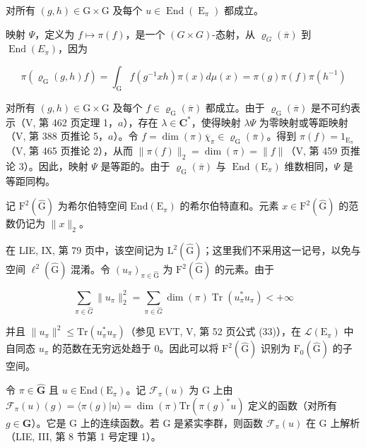 对所有 \((g,h)\in \mathrm{G}\times \mathrm{G}\) 及每个 \(u\in \operatorname {End}(\operatorname {E}_{\pi})\) 都成立。

映射 \(\Psi\)，定义为 \(f\mapsto\pi(f)\)，是一个 \((G\times G)\)-态射，从 \(\varrho_{G}(\overline{\pi})\) 到 \(\operatorname{End}(E_{\pi})\)，因为

\[
\pi (\varrho_ {\mathrm{G}} (g, h) f) = \int_ {\mathrm{G}} f (g ^ {- 1} x h) \pi (x) d \mu (x) = \pi (g) \pi (f) \pi (h ^ {- 1})
\]

对所有 \((g,h)\in\mathrm{G}\times\mathrm{G}\) 及每个 \(f\in\varrho_{\mathrm{G}}(\overline{\pi})\) 都成立。由于 \(\varrho_{\mathrm{G}}(\overline{\pi})\) 是不可约表示（V, 第 462 页定理 1，\(a\)），存在 \(\lambda\in\mathbf{C}^{*}\)，使得映射 \(\lambda\Psi\) 为零映射或等距映射（V, 第 388 页推论 5，\(a\)）。令 \(f=\dim(\pi)\overline{\chi}_{\pi}\in\varrho_{\mathrm{G}}(\overline{\pi})\)。得到 \(\pi(f)=1_{\mathrm{E}_{\pi}}\)（V, 第 465 页推论 2），从而 \(\|\pi(f)\|_{2}=\dim(\pi)=\|f\|\)（V, 第 459 页推论 3）。因此，映射 \(\Psi\) 是等距的。由于 \(\varrho_{\mathrm{G}}(\overline{\pi})\) 与 \(\operatorname{End}(\mathrm{E}_{\pi})\) 维数相同，\(\Psi\) 是等距同构。

记 \(\mathrm{F}^{2}(\widehat{\mathrm{G}})\) 为希尔伯特空间 \(\mathrm{End}(\mathrm{E}_{\pi})\) 的希尔伯特直和。元素 \(x \in \mathrm{F}^{2}(\widehat{\mathrm{G}})\) 的范数仍记为 \(\|x\|_{2}\)。

在 LIE, IX, 第 79 页中，该空间记为 \(\mathrm{L}^{2}(\widehat{\mathrm{G}})\)；这里我们不采用这一记号，以免与空间 \(\ell^{2}(\widehat{\mathrm{G}})\) 混淆。令 \((u_{\pi})_{\pi\in\widehat{\mathrm{G}}}\) 为 \(\mathrm{F}^{2}(\widehat{\mathrm{G}})\) 的元素。由于

\[
\sum_ {\pi \in \widehat {G}} \| u _ {\pi} \| _ {2} ^ {2} = \sum_ {\pi \in \widehat {G}} \dim (\pi) \operatorname{Tr} (u _ {\pi} ^ {*} u _ {\pi}) <   + \infty
\]

并且 \(\|u_{\pi}\|^{2}\leqslant\mathrm{Tr}(u_{\pi}^{*}u_{\pi})\)（参见 EVT, V, 第 52 页公式 (33)），在 \(\mathcal{L}(\mathrm{E}_{\pi})\) 中自同态 \(u_{\pi}\) 的范数在无穷远处趋于 0。因此可以将 \(\mathrm{F}^{2}(\widehat{\mathrm{G}})\) 识别为 \(\mathrm{F}_{0}(\widehat{\mathrm{G}})\) 的子空间。

令 \(\pi \in \widehat{\mathbf{G}}\) 且 \(u \in \mathrm{End}(\mathrm{E}_{\pi})\)。记 \(\mathcal{F}_{\pi}(u)\) 为 G 上由 \(\mathcal{F}_{\pi}(u)(g) = \langle \pi(g) | u \rangle = \dim(\pi) \mathrm{Tr}(\pi(g)^{*} u)\) 定义的函数（对所有 \(g \in \mathbf{G}\)）。它是 G 上的连续函数。若 G 是紧实李群，则函数 \(\mathcal{F}_{\pi}(u)\) 在 G 上解析（LIE, III, 第 8 节第 1 号定理 1）。


